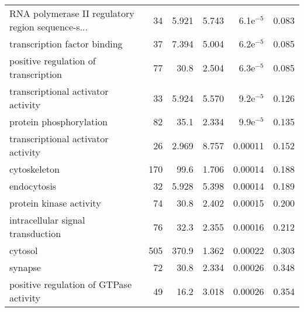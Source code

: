 \begin{longtable}{lrrrrr}
 RNA polymerase II regulatory region sequence-s... &                      34 &                   5.921 &      5.743 &          6.1e$^{-5}$ &                0.083 \\
                      transcription factor binding &                      37 &                   7.394 &      5.004 &          6.2e$^{-5}$ &                0.085 \\
              positive regulation of transcription &                      77 &                    30.8 &      2.504 &          6.3e$^{-5}$ &                0.085 \\
                transcriptional activator activity &                      33 &                   5.924 &      5.570 &          9.2e$^{-5}$ &                0.126 \\
                           protein phosphorylation &                      82 &                    35.1 &      2.334 &          9.9e$^{-5}$ &                0.135 \\
                transcriptional activator activity &                      26 &                   2.969 &      8.757 &              0.00011 &                0.152 \\
                                      cytoskeleton &                     170 &                    99.6 &      1.706 &              0.00014 &                0.188 \\
                                       endocytosis &                      32 &                   5.928 &      5.398 &              0.00014 &                0.189 \\
                           protein kinase activity &                      74 &                    30.8 &      2.402 &              0.00015 &                0.200 \\
                 intracellular signal transduction &                      76 &                    32.3 &      2.355 &              0.00016 &                0.212 \\
                                           cytosol &                     505 &                   370.9 &      1.362 &              0.00022 &                0.303 \\
                                           synapse &                      72 &                    30.8 &      2.334 &              0.00026 &                0.348 \\
            positive regulation of GTPase activity &                      49 &                    16.2 &      3.018 &              0.00026 &                0.354 \\

\end{longtable}
